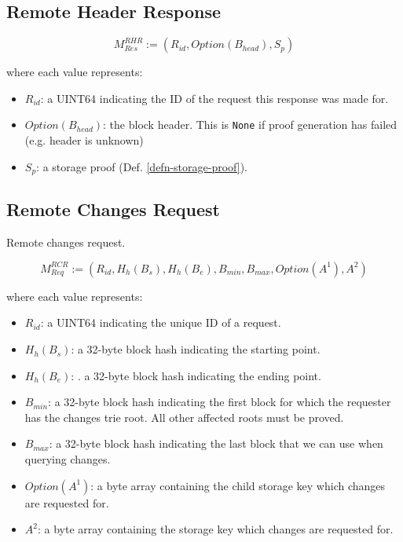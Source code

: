 \documentclass{book}
\begin{document}
\subsection{Remote Header Response}

\[
    M^{RHR}_{Res} := (R_{id}, Option(B_{head}), S_p)
\]

where each value represents:

\begin{itemize}
    \item $R_{id}$: a UINT64 indicating the ID of the request this response was
    made for.
    \item $Option(B_{head})$: the block header. This is \verb|None| if proof generation
    has failed (e.g. header is unknown)
    \item $S_p$: a storage proof (Def. \ref{defn-storage-proof}).
\end{itemize}

\subsection{Remote Changes Request}\label{sect-remote-changes-request}

Remote changes request.

\[
    M^{RCR}_{Req} := (R_{id}, H_h(B_s), H_h(B_e), B_{min}, B_{max}, Option(A^1), A^2)
\]

where each value represents:

\begin{itemize}
    \item $R_{id}$: a UINT64 indicating the unique ID of a request.
    \item $H_h(B_s)$: a 32-byte block hash indicating the starting point.
    \item $H_h(B_e)$: . a 32-byte block hash indicating the ending point.
    \item $B_{min}$: a 32-byte block hash indicating the first block for which
    the requester has the changes trie root. All other affected roots must be
    proved.
    \item $B_{max}$: a 32-byte block hash indicating the last block that we can
    use when querying changes.
    \item $Option(A^1)$: a byte array containing the child storage key which
    changes are requested for.
    \item $A^2$: a byte array containing the storage key which changes are
    requested for.
\end{itemize}
\end{document}
